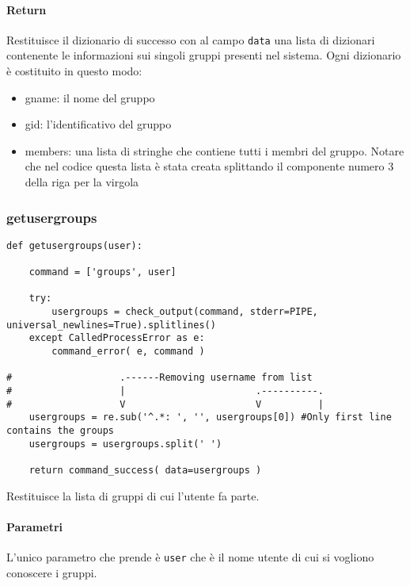 \documentclass[11pt]{article}
\begin{document}
\paragraph{Return}
Restituisce il dizionario di successo con al campo \texttt{data} una lista di dizionari contenente le informazioni
sui singoli gruppi presenti nel sistema. Ogni dizionario è costituito in questo modo:
\begin{itemize}
	\item{gname: il nome del gruppo}
	\item{gid: l'identificativo del gruppo}
	\item{members: una lista di stringhe che contiene tutti i membri del gruppo. Notare che nel codice questa lista
		è stata creata splittando il componente numero 3 della riga per la virgola}
\end{itemize}

\subsubsection{getusergroups}\label{getusergroups}
\begin{lstlisting}
def getusergroups(user):

    command = ['groups', user]
    
    try:
        usergroups = check_output(command, stderr=PIPE, universal_newlines=True).splitlines()
    except CalledProcessError as e:
        command_error( e, command )

#                   .------Removing username from list
#                   |                       .----------.
#                   V                       V          | 
    usergroups = re.sub('^.*: ', '', usergroups[0]) #Only first line contains the groups
    usergroups = usergroups.split(' ')

    return command_success( data=usergroups )
\end{lstlisting}
Restituisce la lista di gruppi di cui l'utente fa parte.
\paragraph{Parametri}
L'unico parametro che prende è \texttt{user} che è il nome utente di cui si vogliono conoscere i gruppi.
\end{document}
